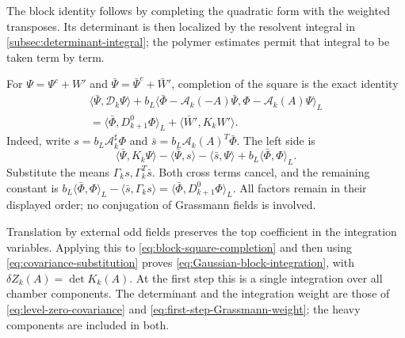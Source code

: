 The block identity follows by completing the quadratic form with the
weighted transposes. Its determinant is then localized by the
resolvent integral in \cref{subsec:determinant-integral}; the polymer
estimates permit that integral to be taken term by term.

For $\Psi=\Psi^c+W'$ and $\bar\Psi=\bar\Psi^c+\bar W'$,
completion of the square is the exact identity
\begin{multline}\label{eq:block-square-completion}
 \langle\bar\Psi,\mathcal D_k\Psi\rangle
   +b_L\langle\bar\Phi-\mathcal A_k(-A)\bar\Psi,
                    \Phi-\mathcal A_k(A)\Psi\rangle_L\\
   =\langle\bar\Phi,D_{k+1}^0\Phi\rangle_L
                    +\langle\bar W',K_kW'\rangle.
\end{multline}
Indeed, write $s=b_L\mathcal A_k^\sharp\Phi$ and
$\bar s=b_L\mathcal A_k(A)^T\bar\Phi$. The left side is
\[
 \langle\bar\Psi,K_k\Psi\rangle
      -\langle\bar\Psi,s\rangle-\langle\bar s,\Psi\rangle
      +b_L\langle\bar\Phi,\Phi\rangle_L.
\]
Substitute the means $\Gamma_ks,\Gamma_k^T\bar s$. Both cross
terms cancel, and the remaining constant is
$b_L\langle\bar\Phi,\Phi\rangle_L
-\langle\bar s,\Gamma_ks\rangle
=\langle\bar\Phi,D_{k+1}^0\Phi\rangle_L$.
All factors remain in their displayed order; no conjugation of
Grassmann fields is involved.

Translation by external odd fields preserves the top coefficient
in the integration variables. Applying this to
\eqref{eq:block-square-completion} and then using
\eqref{eq:covariance-substitution} proves
\eqref{eq:Gaussian-block-integration}, with $\delta Z_k(A)=\det K_k(A)$.
At the first step this is a single integration over all chamber
components. The determinant and the integration weight are those of
\eqref{eq:level-zero-covariance} and
\eqref{eq:first-step-Grassmann-weight}; the heavy components are
included in both.

